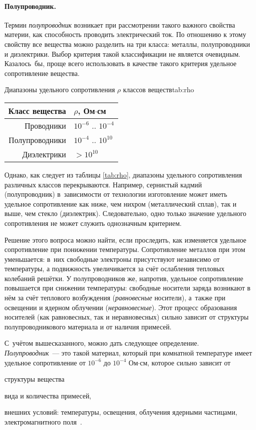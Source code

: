 \documentclass[a4paper, 14pt, titlepage]{extarticle}
\let\term\emph
\newcommand{\term}[1]{\emph{#1}}
\begin{document}
  \paragraph{Полупроводник.} Термин \term{полупроводник} возникает при рассмотрении такого важного
  свойства материи, как способность проводить электрический ток. По отношению к этому свойству все
  вещества можно разделить на три класса: металлы, полупроводники и диэлектрики. Выбор критерия
  такой классификации не является очевидным. Казалось~бы, проще всего использовать в качестве такого
  критерия удельное сопротивление вещества.

  \begin{mytable}{Диапазоны удельного сопротивления $\rho$ классов веществ}{tab:rho}
    \begin{tabular}{r|l}
      Класс вещества & $\rho$, Ом$\cdot$см \\
      \hline
      Проводники     & $10^{-6}$ .. $10^{-4}$\\
      Полупроводники & $10^{-4}$ .. $10^{10}$\\
      Диэлектрики    & $> 10^{10}$\\
    \end{tabular}
  \end{mytable}

  Однако, как следует из таблицы \ref{tab:rho}, диапазоны удельного сопротивления различных классов
  перекрываются. Например, сернистый кадмий (полупроводник) в~зависимости от технологии изготовление
  может иметь удельное сопротивление как ниже, чем нихром (металлический сплав), так и выше, чем
  стекло (диэлектрик). Следовательно, одно только значение удельного сопротивления не может служить
  однозначным критерием.

  Решение этого вопроса можно найти, если проследить, как изменяется удельное сопротивление при
  понижении температуры. Сопротивление металлов при этом уменьшается: в~них свободные электроны
  присутствуют независимо от температуры, а подвижность увеличивается за счёт ослабления тепловых
  колебаний решётки. У полупроводников же, напротив, удельное сопротивление повышается при снижении
  температуры: свободные носители заряда возникают в нём за счёт теплового возбуждения
  (\term{равновесные} носители), а~также при освещении и ядерном облучении (\term{неравновесные}).
  Этот процесс образования носителей (как равновесных, так и неравновесных) сильно зависит от
  структуры полупроводникового материала и от наличия примесей.

  С~учётом вышесказанного, можно дать следующее определение. \term{Полупроводник}~--- это такой
  материал, который при комнатной температуре имеет удельное сопротивление от $10^{-6}$ до $10^{-4}$
  Ом$\cdot$см, которое сильно зависит от
  \begin{enumerate*}[label=\asbuk*)]
    \item структуры вещества
    \item вида и количества примесей,
    \item внешних условий: температуры, освещения, облучения ядерными частицами, электромагнитного
      поля~\cite{shalimova-semiconductors}.
  \end{enumerate*}
\end{document}
